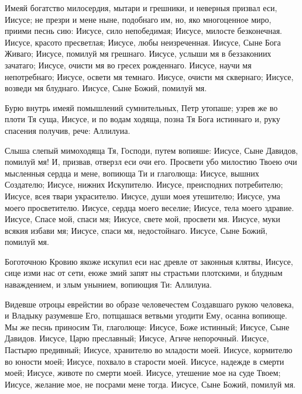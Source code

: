 \begin{mymulticols}

Имеяй
богатство милосердия, мытари и грешники, и неверныя призвал еси, Иисусе; не презри и мене ныне, подобнаго им, но, яко многоценное миро, приими песнь сию: Иисусе, сило непобедимая; Иисусе, милосте
безконечная. Иисусе, красото пресветлая; Иисусе, любы неизреченная. Иисусе, Сыне Бога Живаго; Иисусе, помилуй мя грешнаго. Иисусе, услыши мя в беззакониих зачатаго; Иисусе, очисти мя во гресех рожденнаго. Иисусе, научи мя непотребнаго; Иисусе, освети мя темнаго. Иисусе, очисти мя сквернаго; Иисусе, возведи мя блуднаго. Иисусе, Сыне Божий, помилуй мя.


Бурю
внутрь имеяй помышлений сумнительных, Петр утопаше; узрев же во плоти Тя суща, Иисусе, и по водам ходяща, позна Тя Бога истиннаго и, руку спасения получив, рече: Аллилуиа.


Слыша
слепый мимоходяща Тя, Господи, путем вопияше: Иисусе, Сыне Давидов, помилуй мя! И, призвав, отверзл еси очи его. Просвети убо милостию Твоею очи мысленныя сердца и мене, вопиюща Ти и глаголюща: Иисусе, вышних Создателю; Иисусе, нижних Искупителю. Иисусе, преисподних потребителю; Иисусе, всея твари украсителю. Иисусе, души моея утешителю; Иисусе, ума моего просветителю. Иисусе, сердца моего веселие; Иисусе, тела моего здравие. Иисусе, Спасе мой, спаси мя; Иисусе, свете мой, просвети мя. Иисусе, муки всякия избави мя; Иисусе, спаси мя, недостойнаго. Иисусе, Сыне Божий, помилуй мя.


Боготочною
Кровию якоже искупил еси нас древле от законныя клятвы, Иисусе, сице изми нас от сети, еюже змий запят ны страстьми плотскими, и блудным наваждением, и злым унынием, вопиющия Ти: Аллилуиа.


Видевше
отроцы еврейстии во образе человечестем Создавшаго рукою человека, и Владыку разумевше Его, потщашася ветвьми угодити Ему, осанна вопиюще. Мы же песнь приносим Ти, глаголюще: Иисусе, Боже истинный; Иисусе, Сыне Давидов. Иисусе, Царю преславный; Иисусе, Агнче непорочный. Иисусе, Пастырю предивный; Иисусе, хранителю во младости моей. Иисусе, кормителю во юности моей; Иисусе, похвало в старости моей. Иисусе, надежде в смерти моей; Иисусе, животе по смерти моей. Иисусе, утешение мое на суде Твоем; Иисусе, желание мое, не посрами мене тогда. Иисусе, Сыне Божий, помилуй мя.


\end{mymulticols}
